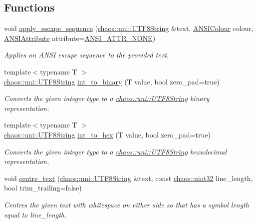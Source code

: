 \subsection*{Functions}
\begin{DoxyCompactItemize}
\item 
void \hyperlink{namespacechaos_1_1io_1_1format_ae9aebf86c855cb5ed332902264a507b7}{apply\+\_\+escape\+\_\+sequence} (\hyperlink{classchaos_1_1uni_1_1_u_t_f8_string}{chaos\+::uni\+::\+U\+T\+F8\+String} \&text, \hyperlink{namespacechaos_1_1io_1_1format_aa30dcff2478ffc94e33504c8886a5b1a}{A\+N\+S\+I\+Colour} colour, \hyperlink{namespacechaos_1_1io_1_1format_af01119682ec0bc616b49641e0c2a7ccf}{A\+N\+S\+I\+Attribute} attribute=\hyperlink{namespacechaos_1_1io_1_1format_af01119682ec0bc616b49641e0c2a7ccfa3154b286513beb167bb516ea15f1cfb5}{A\+N\+S\+I\+\_\+\+A\+T\+T\+R\+\_\+\+N\+O\+N\+E})
\begin{DoxyCompactList}\small\item\em Applies an A\+N\+S\+I escape sequence to the provided text. \end{DoxyCompactList}\item 
{\footnotesize template$<$typename T $>$ }\\\hyperlink{classchaos_1_1uni_1_1_u_t_f8_string}{chaos\+::uni\+::\+U\+T\+F8\+String} \hyperlink{namespacechaos_1_1io_1_1format_a959b39b5d59d3cbbe277f214fe31c70a}{int\+\_\+to\+\_\+binary} (T value, bool zero\+\_\+pad=true)
\begin{DoxyCompactList}\small\item\em Converts the given integer type to a \hyperlink{classchaos_1_1uni_1_1_u_t_f8_string}{chaos\+::uni\+::\+U\+T\+F8\+String} binary representation. \end{DoxyCompactList}\item 
{\footnotesize template$<$typename T $>$ }\\\hyperlink{classchaos_1_1uni_1_1_u_t_f8_string}{chaos\+::uni\+::\+U\+T\+F8\+String} \hyperlink{namespacechaos_1_1io_1_1format_a1a0d0c026284787a225be9073770e264}{int\+\_\+to\+\_\+hex} (T value, bool zero\+\_\+pad=true)
\begin{DoxyCompactList}\small\item\em Converts the given integer type to a \hyperlink{classchaos_1_1uni_1_1_u_t_f8_string}{chaos\+::uni\+::\+U\+T\+F8\+String} hexadecimal representation. \end{DoxyCompactList}\item 
void \hyperlink{namespacechaos_1_1io_1_1format_ac53c87508bb81f6fc26efd9bfca7b027}{centre\+\_\+text} (\hyperlink{classchaos_1_1uni_1_1_u_t_f8_string}{chaos\+::uni\+::\+U\+T\+F8\+String} \&text, const \hyperlink{namespacechaos_a8641b3ae4551f0b35570d4f9f4ec22d9}{chaos\+::uint32} line\+\_\+length, bool trim\+\_\+trailing=false)
\begin{DoxyCompactList}\small\item\em Centres the given text with whitespace on either side so that has a symbol length equal to line\+\_\+length. \end{DoxyCompactList}\end{DoxyCompactItemize}


